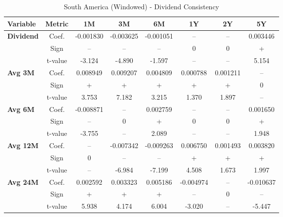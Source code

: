 \documentclass[11pt,english,a4paper,hidelinks]{book}
\begin{document}
\begin{table}[H]
    \centering
    \caption{South America (Windowed) - Dividend Consistency}
    \begin{tabular}{lccccccc}
        \toprule
        \textbf{Variable} & \textbf{Metric} & \textbf{1M} & \textbf{3M} & \textbf{6M} & \textbf{1Y} & \textbf{2Y} & \textbf{5Y} \\
        \midrule
        \multirow{3}{*}{\textbf{Dividend}}
            & Coef.   & -0.001830 & -0.003625 & -0.001051 & --        & --        & 0.003446 \\
            & Sign    & –         & –         & –         & 0         & 0         & +         \\
            & t-value & -3.124    & -4.890    & -1.597    & --        & --        & 5.154    \\
        \cmidrule{1-8}
        \multirow{3}{*}{\textbf{Avg 3M}}
            & Coef.   & 0.008949  & 0.009207  & 0.004809  & 0.000788  & 0.001211  & --        \\
            & Sign    & +         & +         & +         & +         & +         & 0         \\
            & t-value & 3.753     & 7.182     & 3.215     & 1.370     & 1.897     & --        \\
        \cmidrule{1-8}
        \multirow{3}{*}{\textbf{Avg 6M}}
            & Coef.   & -0.008871 & --        & 0.002759  & --        & --        & 0.001650  \\
            & Sign    & –         & 0         & +         & 0         & 0         & +         \\
            & t-value & -3.755    & --        & 2.089     & --        & --        & 1.948     \\
        \cmidrule{1-8}
        \multirow{3}{*}{\textbf{Avg 12M}}
            & Coef.   & --        & -0.007342 & -0.009263 & 0.006750  & 0.001493  & 0.003820  \\
            & Sign    & 0         & –         & –         & +         & +         & +         \\
            & t-value & --        & -6.984    & -7.199    & 4.508     & 1.673     & 1.997     \\
        \cmidrule{1-8}
        \multirow{3}{*}{\textbf{Avg 24M}}
            & Coef.   & 0.002592  & 0.003323  & 0.005186  & -0.004974 & --        & -0.010637 \\
            & Sign    & +         & +         & +         & –         & 0         & –         \\
            & t-value & 5.938     & 4.174     & 6.004     & -3.020    & --        & -5.447    \\
        
        \bottomrule
    \end{tabular}
    \label{tab:south_america_dividend_consistency}
\end{table}
\end{document}
